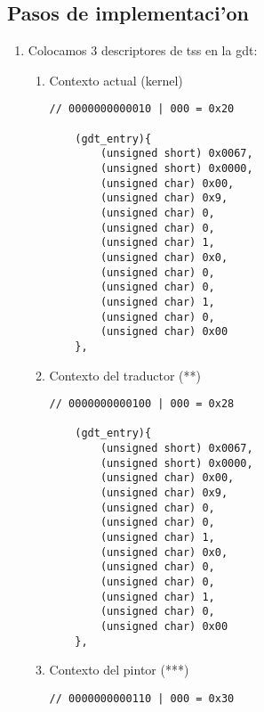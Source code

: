 \documentclass[11pt]{article}
\begin{document}
\subsection{Pasos de implementaci'on}
\begin{enumerate}
\item
Colocamos 3 descriptores de tss en la gdt:
\begin{enumerate}
\item
Contexto actual (kernel) 
\begin{lstlisting}[frame=single]
// 0000000000010 | 000 = 0x20

	(gdt_entry){ 
		(unsigned short) 0x0067, 
		(unsigned short) 0x0000,
		(unsigned char) 0x00, 
		(unsigned char) 0x9, 
		(unsigned char) 0, 
		(unsigned char) 0, 
		(unsigned char) 1, 
		(unsigned char) 0x0,
		(unsigned char) 0,  
		(unsigned char) 0,  
		(unsigned char) 1,  
		(unsigned char) 0, 
		(unsigned char) 0x00 
	},
\end{lstlisting}
\item
Contexto del traductor (**)
\begin{lstlisting}[frame=single]
// 0000000000100 | 000 = 0x28

	(gdt_entry){ 
		(unsigned short) 0x0067, 
		(unsigned short) 0x0000,
		(unsigned char) 0x00, 
		(unsigned char) 0x9, 
		(unsigned char) 0, 
		(unsigned char) 0, 
		(unsigned char) 1, 
		(unsigned char) 0x0,
		(unsigned char) 0,  
		(unsigned char) 0,  
		(unsigned char) 1,  
		(unsigned char) 0, 
		(unsigned char) 0x00 
	},
\end{lstlisting}
\item
Contexto del pintor (***)
\begin{lstlisting}[frame=single]
// 0000000000110 | 000 = 0x30


\end{lstlisting}
\end{enumerate}
\end{enumerate}
\end{document}
